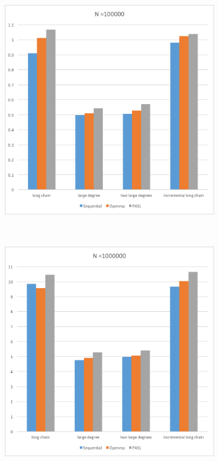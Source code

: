 \documentclass[specification,annotation]{itmo-student-thesis}
\begin{document}
\begin{figure}[!ht]
\begin{subfigure}[b]{0.45\textwidth}
    \includegraphics[width=\textwidth]{pic/results-1-b.png}
\end{subfigure}\\
\begin{subfigure}[b]{0.45\textwidth}
    \includegraphics[width=\textwidth]{pic/results-1-c.png}

\end{subfigure}
\end{figure}
\end{document}
